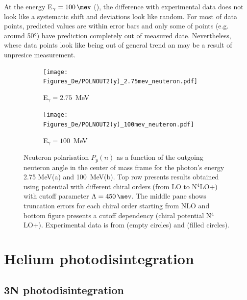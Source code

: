     At the energy E$_\gamma = \SI{100}{\mev}$ (), the difference with experimental
    data does not look like a systematic shift and deviations look like random.
    For most of data points, predicted values are within error bars and only some
    of points (e.g. around \ang{50}) have prediction completely out of measured date.
    Nevertheless, whese data points look like being out of general trend an may be
    a result of unpresice measurement.


    \begin{figure}[h]
        \centering
        \begin{subfigure}[b]{0.46\textwidth}
            \texttt{[image: Figures\_De/POLNOUT2(y)\_2.75mev\_neuteron.pdf]}
            \caption{\small E$_\gamma = 2.75$~MeV}
            \label{Pn_2p75_vert}
        \end{subfigure}
        \begin{subfigure}[b]{0.46\textwidth}
            \texttt{[image: Figures\_De/POLNOUT2(y)\_100mev\_neuteron.pdf]}
            \caption{\small E$_\gamma = 100$~MeV}
            \label{Pn_100_vert}
        \end{subfigure}
        \caption{Neuteron polarisation $P_y(n)$ 
        as a function of the outgoing neuteron angle in the center of mass frame 
        for the photon's energy 2.75 MeV(a) and 100~MeV(b).
        Top row presents results obtained using potential
        with different chiral orders (from LO to N$^4$LO+) with cutoff parameter $\Lambda=\SI{450}{\mev}$.
        The middle pane shows truncation errors for each 
        chiral order starting from NLO and
        bottom figure presents a cutoff dependency (chiral potential N$^4$LO+).
        Experimental data is from \cite{Jewell_neuteronpolarization} (empty circles)
        and \cite{CAMERON_neuteronpolarization} (filled circles).}
        \label{Pn_2p75_100}
    \end{figure}


\clearpage

\section{Helium photodisintegration}
\label{sec:hel_results}

\subsection{3N photodisintegration}

